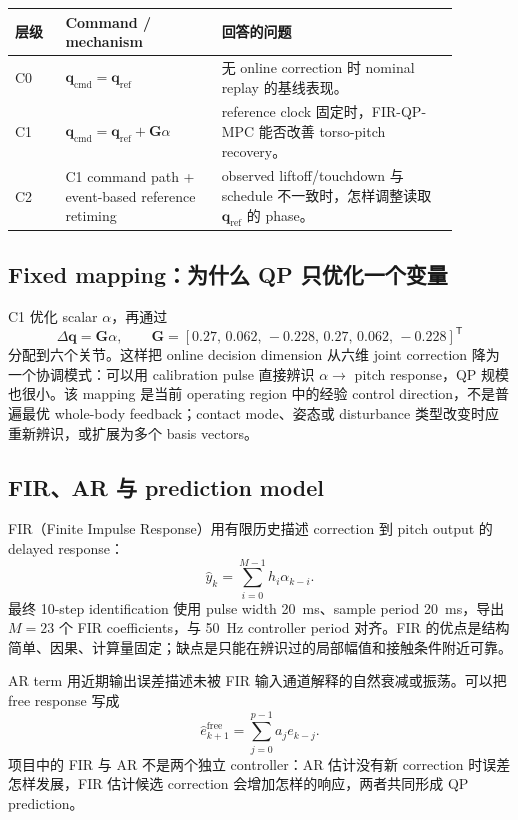 \documentclass[UTF8,11pt,a4paper]{ctexart}
\begin{document}
\begin{longtable}{@{}p{0.10\linewidth}p{0.31\linewidth}p{0.47\linewidth}@{}}
\toprule
层级 & Command / mechanism & 回答的问题 \\
\midrule
\endhead
C0 & $\bm q_{\mathrm{cmd}}=\bm q_{\mathrm{ref}}$ & 无 online correction 时 nominal replay 的基线表现。\\
C1 & $\bm q_{\mathrm{cmd}}=\bm q_{\mathrm{ref}}+\bm G\alpha$ & reference clock 固定时，FIR-QP-MPC 能否改善 torso-pitch recovery。\\
C2 & C1 command path + event-based reference retiming & observed liftoff/touchdown 与 schedule 不一致时，怎样调整读取 $\bm q_{\mathrm{ref}}$ 的 phase。\\
\bottomrule
\end{longtable}

\subsection{Fixed mapping：为什么 QP 只优化一个变量}\label{sec:mapping}

C1 优化 scalar $\alpha$，再通过
\begin{equation}
 \Delta\bm q=\bm G\alpha,\qquad
 \bm G=[0.27,\,0.062,\,-0.228,\,0.27,\,0.062,\,-0.228]^{\mathsf T}
\end{equation}
分配到六个关节。这样把 online decision dimension 从六维 joint correction 降为一个协调模式：可以用 calibration pulse 直接辨识 $\alpha\rightarrow$ pitch response，QP 规模也很小。该 mapping 是当前 operating region 中的经验 control direction，不是普遍最优 whole-body feedback；contact mode、姿态或 disturbance 类型改变时应重新辨识，或扩展为多个 basis vectors。

\subsection{FIR、AR 与 prediction model}\label{sec:firqp}

FIR（Finite Impulse Response）用有限历史描述 correction 到 pitch output 的 delayed response：
\begin{equation}
 \hat y_k=\sum_{i=0}^{M-1}h_i\alpha_{k-i}.
\end{equation}
最终 10-step identification 使用 pulse width \SI{20}{ms}、sample period \SI{20}{ms}，导出 $M=23$ 个 FIR coefficients，与 \SI{50}{Hz} controller period 对齐。FIR 的优点是结构简单、因果、计算量固定；缺点是只能在辨识过的局部幅值和接触条件附近可靠。

AR term 用近期输出误差描述未被 FIR 输入通道解释的自然衰减或振荡。可以把 free response 写成
\begin{equation}
 \hat e_{k+1}^{\mathrm{free}}=\sum_{j=0}^{p-1}a_j e_{k-j}.
\end{equation}
项目中的 FIR 与 AR 不是两个独立 controller：AR 估计没有新 correction 时误差怎样发展，FIR 估计候选 correction 会增加怎样的响应，两者共同形成 QP prediction。
\end{document}
